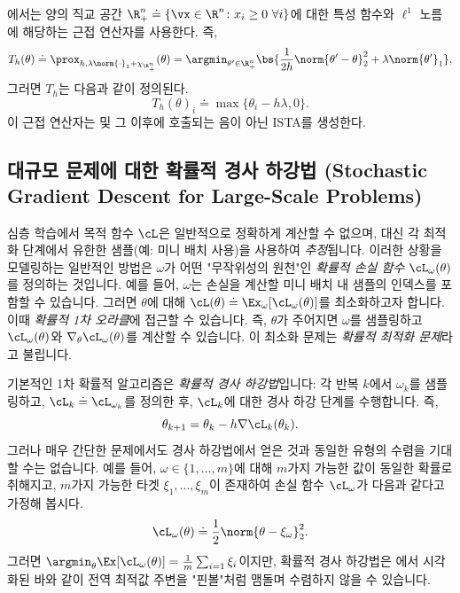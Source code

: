 \documentclass[../../book-main_ko.tex]{subfiles}
\begin{document}
\begin{example}\label{example:prox-of-nonnegative-l1}
    에서는 양의 직교 공간 \(\R_{+}^{n} \doteq \{\vx \in \R^{n} \colon x_{i} \geq 0\ \forall i\}\)에 대한 특성 함수와 \(\ell^{1}\) 노름에 해당하는 근접 연산자를 사용한다. 즉,
    \begin{equation}
        T_{h}(\theta) \doteq \prox_{h, \lambda\norm{\cdot}_{1} + \chi_{\R_{+}^{n}}}(\theta) = \argmin_{\theta^{\prime} \in \R_{+}^{n}}\bs{\frac{1}{2h}\norm{\theta^{\prime} - \theta}_{2}^{2} + \lambda\norm{\theta^{\prime}}_{1}},
    \end{equation}
    그러면 \(T_{h}\)는 다음과 같이 정의된다.
    \begin{equation}
        T_{h}(\theta)_{i} \doteq \max\{\theta_{i} - h\lambda, 0\}.
    \end{equation}
    이 근접 연산자는  및 그 이후에 호출되는 음이 아닌 ISTA를 생성한다.
\end{example}

\subsection{대규모 문제에 대한 확률적 경사 하강법 (Stochastic Gradient Descent for Large-Scale Problems)}

심층 학습에서 목적 함수 \(\cL\)은 일반적으로 정확하게 계산할 수 없으며, 대신 각 최적화 단계에서 유한한 샘플(예: 미니 배치 사용)을 사용하여 \textit{추정}됩니다. 이러한 상황을 모델링하는 일반적인 방법은 \(\omega\)가 어떤 "무작위성의 원천"인 \textit{확률적 손실 함수} \(\cL_{\omega}(\theta)\)를 정의하는 것입니다. 예를 들어, \(\omega\)는 손실을 계산할 미니 배치 내 샘플의 인덱스를 포함할 수 있습니다. 그러면 \(\theta\)에 대해 \(\cL(\theta) \doteq \Ex_{\omega}[\cL_{\omega}(\theta)]\)를 최소화하고자 합니다. 이때 \textit{확률적 1차 오라클}에 접근할 수 있습니다. 즉, \(\theta\)가 주어지면 \(\omega\)를 샘플링하고 \(\cL_{\omega}(\theta)\)와 \(\nabla_{\theta}\cL_{\omega}(\theta)\)를 계산할 수 있습니다. 이 최소화 문제는 \textit{확률적 최적화 문제}라고 불립니다.

기본적인 1차 확률적 알고리즘은 \textit{확률적 경사 하강법}입니다: 각 반복 \(k\)에서 \(\omega_{k}\)를 샘플링하고, \(\cL_{k} \doteq \cL_{\omega_{k}}\)를 정의한 후, \(\cL_{k}\)에 대한 경사 하강 단계를 수행합니다. 즉,
\begin{equation}
    \theta_{k + 1} = \theta_{k} - h\nabla \cL_{k}(\theta_{k}).
\end{equation}
그러나 매우 간단한 문제에서도 경사 하강법에서 얻은 것과 동일한 유형의 수렴을 기대할 수는 없습니다. 예를 들어, \(\omega \in \{1, \dots, m\}\)에 대해 \(m\)가지 가능한 값이 동일한 확률로 취해지고, \(m\)가지 가능한 타겟 \(\xi_{1}, \dots, \xi_{m}\)이 존재하여 손실 함수 \(\cL_{\omega}\)가 다음과 같다고 가정해 봅시다.
\begin{equation}
    \cL_{\omega}(\theta) \doteq \frac{1}{2}\norm{\theta - \xi_{\omega}}_{2}^{2}.
\end{equation}
그러면 \(\argmin_{\theta}\Ex[\cL_{\omega}(\theta)] = \frac{1}{m}\sum_{i = 1}\xi_{i}\)이지만, 확률적 경사 하강법은 에서 시각화된 바와 같이 전역 최적값 주변을 "핀볼"처럼 맴돌며 수렴하지 않을 수 있습니다.
\end{document}
